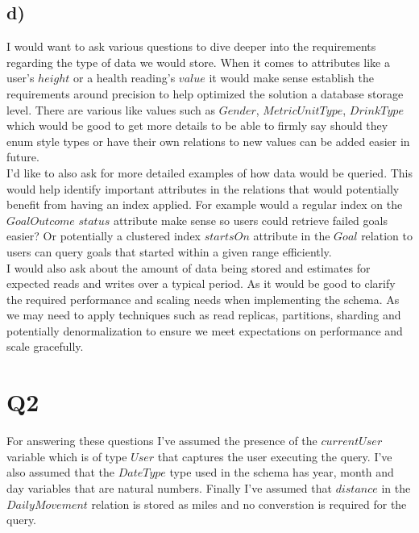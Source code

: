 \documentclass{article}
\begin{document}
\pagebreak

\subsection*{\small d)}

I would want to ask various questions to dive deeper into the requirements regarding the type of data we would store. When it comes to attributes like a user’s $height$ or a health reading’s $value$ it would make sense establish the requirements around precision to help optimized the solution a database storage level. There are various like values such as $Gender$, $MetricUnitType$, $DrinkType$ which would be good to get more details to be able to firmly say should they enum style types or have their own relations to new values can be added easier in future. \\
\newline
I'd like to also ask for more detailed examples of how data would be queried. This would help identify important attributes in the relations that would potentially benefit from having an index applied. For example would a regular index on the $GoalOutcome$ $status$ attribute make sense so users could retrieve failed goals easier? Or potentially a clustered index $startsOn$ attribute in the $Goal$ relation to users can query goals that started within a given range efficiently. \\
\newline
I would also ask about the amount of data being stored and estimates for expected reads and writes over a typical period. As it would be good to clarify the required performance and scaling needs when implementing the schema. As we may need to apply techniques such as read replicas, partitions, sharding and potentially denormalization to ensure we meet expectations on performance and scale gracefully.

\pagebreak

\section*{Q2}

For answering these questions I've assumed the presence of the $currentUser$ variable which is of type $User$ that captures the user executing the query. I've also assumed that the $DateType$ type used in the schema has year, month and day variables that are natural numbers. Finally I've assumed that $distance$ in the $DailyMovement$ relation is stored as miles and no converstion is required for the query.
\end{document}
